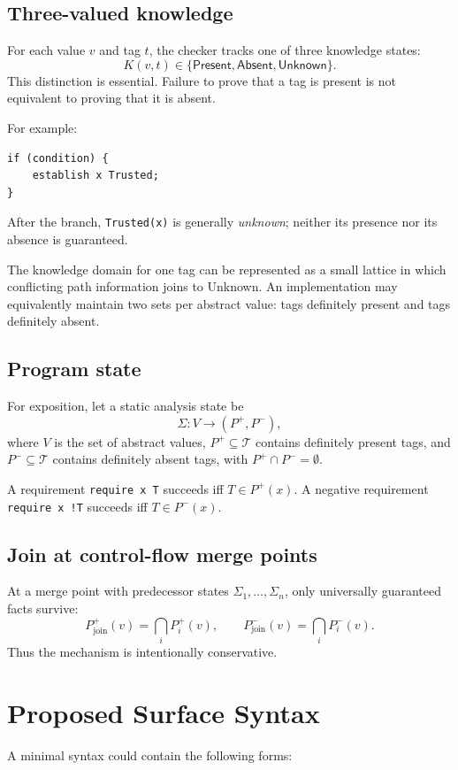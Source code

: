 \documentclass[11pt]{article}
\begin{document}
\subsection{Three-valued knowledge}
For each value $v$ and tag $t$, the checker tracks one of three knowledge states:
\[
K(v,t) \in \{\mathsf{Present},\mathsf{Absent},\mathsf{Unknown}\}.
\]
This distinction is essential. Failure to prove that a tag is present is not equivalent to proving that it is absent.

For example:

\begin{lstlisting}
if (condition) {
    establish x Trusted;
}
\end{lstlisting}

After the branch, \texttt{Trusted(x)} is generally \emph{unknown}; neither its presence nor its absence is guaranteed.

The knowledge domain for one tag can be represented as a small lattice in which conflicting path information joins to \textsf{Unknown}. An implementation may equivalently maintain two sets per abstract value: tags definitely present and tags definitely absent.

\subsection{Program state}
For exposition, let a static analysis state be
\[
\Sigma : V \to (P^+,P^-),
\]
where $V$ is the set of abstract values, $P^+ \subseteq \mathcal{T}$ contains definitely present tags, and $P^- \subseteq \mathcal{T}$ contains definitely absent tags, with $P^+ \cap P^- = \emptyset$.

A requirement \texttt{require x T} succeeds iff $T \in P^+(x)$. A negative requirement \texttt{require x !T} succeeds iff $T \in P^-(x)$.

\subsection{Join at control-flow merge points}
At a merge point with predecessor states $\Sigma_1,\ldots,\Sigma_n$, only universally guaranteed facts survive:
\[
P^+_{\mathrm{join}}(v)=\bigcap_i P^+_i(v),
\qquad
P^-_{\mathrm{join}}(v)=\bigcap_i P^-_i(v).
\]
Thus the mechanism is intentionally conservative.

\section{Proposed Surface Syntax}
A minimal syntax could contain the following forms:
\end{document}
